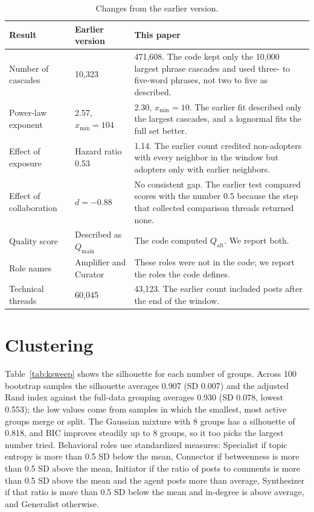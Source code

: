 \documentclass[11pt]{article}
\newcommand{\qmain}{Q_{\text{main}}}
\newcommand{\qalt}{Q_{\text{alt}}}
\begin{document}
\begin{table}[H]
\centering
\caption{Changes from the earlier version.}
\label{tab:changes}
\small
\begin{tabular}{@{}p{3.2cm}p{4.6cm}p{6.6cm}@{}}
\toprule
\textbf{Result} & \textbf{Earlier version} & \textbf{This paper} \\
\midrule
Number of cascades & 10,323 & 471,608. The code kept only the 10,000 largest phrase cascades and used three- to five-word phrases, not two to five as described. \\
Power-law exponent & 2.57, $x_{\min} = 104$ & 2.30, $x_{\min} = 10$. The earlier fit described only the largest cascades, and a lognormal fits the full set better. \\
Effect of exposure & Hazard ratio 0.53 & 1.14. The earlier count credited non-adopters with every neighbor in the window but adopters only with earlier neighbors. \\
Effect of collaboration & $d = -0.88$ & No consistent gap. The earlier test compared scores with the number 0.5 because the step that collected comparison threads returned none. \\
Quality score & Described as $\qmain$ & The code computed $\qalt$. We report both. \\
Role names & Amplifier and Curator & These roles were not in the code; we report the roles the code defines. \\
Technical threads & 60,045 & 43,123. The earlier count included posts after the end of the window. \\
\bottomrule
\end{tabular}
\end{table}

\section{Clustering}
\label{app:clustering}

Table~\ref{tab:ksweep} shows the silhouette for each number of groups. Across 100 bootstrap samples the silhouette averages 0.907 (SD 0.007) and the adjusted Rand index against the full-data grouping averages 0.930 (SD 0.078, lowest 0.553); the low values come from samples in which the smallest, most active groups merge or split. The Gaussian mixture with 8 groups has a silhouette of 0.818, and BIC improves steadily up to 8 groups, so it too picks the largest number tried. Behavioral roles use standardized measures: Specialist if topic entropy is more than 0.5 SD below the mean, Connector if betweenness is more than 0.5 SD above the mean, Initiator if the ratio of posts to comments is more than 0.5 SD above the mean and the agent posts more than average, Synthesizer if that ratio is more than 0.5 SD below the mean and in-degree is above average, and Generalist otherwise.
\end{document}
